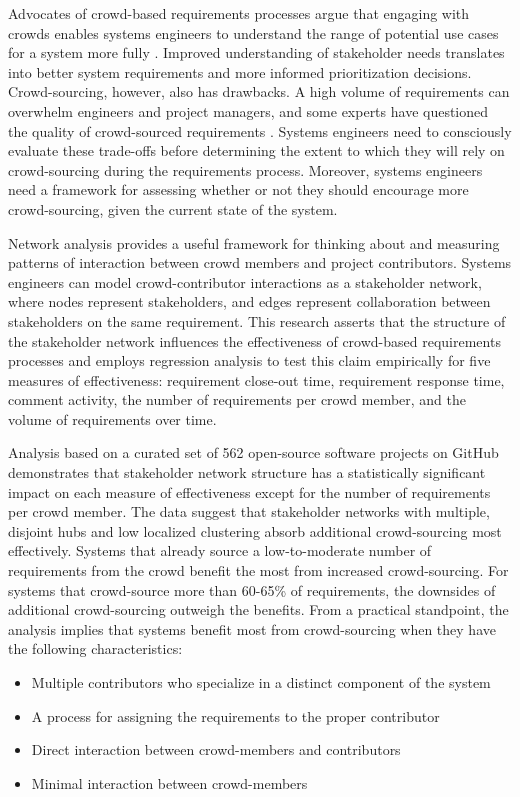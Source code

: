 Advocates of crowd-based requirements processes argue that engaging with crowds enables systems engineers to understand the range of potential use cases for a system more fully \cite{groen}. Improved understanding of stakeholder needs translates into better system requirements and more informed prioritization decisions. Crowd-sourcing, however, also has drawbacks. A high volume of requirements can overwhelm engineers and project managers, and some experts have questioned the quality of crowd-sourced requirements \cite{snijders}. Systems engineers need to consciously evaluate these trade-offs before determining the extent to which they will rely on crowd-sourcing during the requirements process. Moreover, systems engineers need a framework for assessing whether or not they should encourage more crowd-sourcing, given the current state of the system.

Network analysis provides a useful framework for thinking about and measuring patterns of interaction between crowd members and project contributors. Systems engineers can model crowd-contributor interactions as a stakeholder network, where nodes represent stakeholders, and edges represent collaboration between stakeholders on the same requirement. This research asserts that the structure of the stakeholder network influences the effectiveness of crowd-based requirements processes and employs regression analysis to test this claim empirically for five measures of effectiveness: requirement close-out time, requirement response time, comment activity, the number of requirements per crowd member, and the volume of requirements over time.

Analysis based on a curated set of 562 open-source software projects on GitHub demonstrates that stakeholder network structure has a statistically significant impact on each measure of effectiveness except for the number of requirements per crowd member. The data suggest that stakeholder networks with multiple, disjoint hubs and low localized clustering absorb additional crowd-sourcing most effectively. Systems that already source a low-to-moderate number of requirements from the crowd benefit the most from increased crowd-sourcing. For systems that crowd-source more than 60-65\% of requirements, the downsides of additional crowd-sourcing outweigh the benefits. From a practical standpoint, the analysis implies that systems benefit most from crowd-sourcing when they have the following characteristics:

\begin{itemize}
    \item Multiple contributors who specialize in a distinct component of the system
    \item A process for assigning the requirements to the proper contributor
    \item Direct interaction between crowd-members and contributors
    \item Minimal interaction between crowd-members
\end{itemize}

